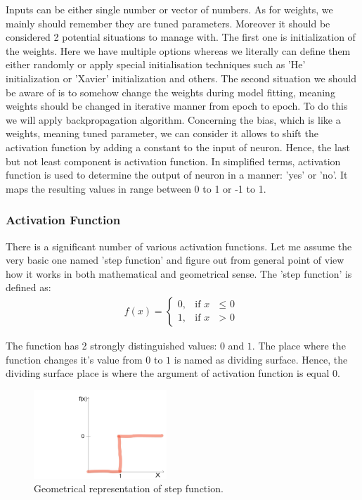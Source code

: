 Inputs can be either single number or vector of numbers. As for weights, we mainly should remember they are tuned parameters. Moreover it should be considered 2 potential situations to manage with. The first one is initialization of the weights. Here we have multiple options whereas we literally can define them either randomly or apply special initialisation techniques such as 'He' initialization or 'Xavier' initialization and others. The second situation we should be aware of is to somehow change the weights during model fitting, meaning weights should be changed in iterative manner from epoch to epoch. To do this we will apply backpropagation algorithm. Concerning the bias, which is like a weights, meaning tuned parameter, we can consider it allows to shift the activation function by adding a constant to the input of neuron. Hence, the last but not least component is activation function. In simplified terms, activation function is used to determine the output of neuron in a manner: 'yes' or 'no'. It maps the resulting values in range between 0 to 1 or -1 to 1.            

\subsubsection{Activation Function}
There is a significant number of various activation functions. Let me assume the very basic one named 'step function' and figure out from general point of view how it works in both mathematical and geometrical sense.   
The 'step function' is defined as:
\begin{align*}
f(x) = \begin{cases} 0, & \mbox{if } x\mbox{ $\leq$ 0} \\ 1, & \mbox{if } x\mbox{ $>$ 0} \end{cases}
\end{align*}

The function has 2 strongly distinguished values: $0$ and $1$. The place where the function changes it's value from $0$ to $1$ is named as dividing surface. Hence, the dividing surface place is where the argument of activation function is equal $0$.

\begin{figure}[h]
    \centering \includegraphics[width=5cm]{images/step_function.jpg}
    \caption {Geometrical representation of step function.}
\end{figure}

